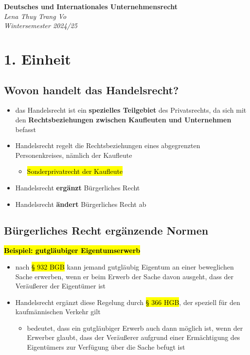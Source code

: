 \documentclass[a4paper, 10pt]{article}
\begin{document}
\begin{titlepage}
    \centering
    \vspace*{3cm}
    {\Huge \textbf{Deutsches und Internationales Unternehmensrecht}}\\[1.5cm]
    {\large \textit{Lena Thuy Trang Vo}}\\[0.5cm]
    {\large \textit{Wintersemester 2024/25}}\\[2cm]

    \vfill
\end{titlepage}

\tableofcontents
\newpage

\section{1. Einheit}
\subsection{Wovon handelt das Handelsrecht?}
\begin{itemize}
    \item das Handelsrecht ist ein \textbf{spezielles Teilgebiet} des Privatsrechts, da sich mit den \textbf{Rechtsbeziehungen zwischen Kaufleuten und Unternehmen} befasst
    \item  Handelsrecht regelt die Rechtsbeziehungen eines abgegrenzten Personenkreises, nämlich der Kaufleute
    \begin{itemize}
        \item \hl{Sonderprivatrecht der Kaufleute}
    \end{itemize}
    \item Handelsrecht \textbf{ergänzt} Bürgerliches Recht
    \item Handelsrecht \textbf{ändert} Bürgerliches Recht ab
\end{itemize}
\subsection{Bürgerliches Recht ergänzende Normen}
\textbf{\hl{Beispiel: gutgläubiger Eigentumserwerb}}
\begin{itemize}
    \item nach \hl{§ 932 BGB} kann jemand gutgläubig Eigentum an einer beweglichen Sache erwerben, wenn er beim Erwerb der Sache davon ausgeht, dass der Veräußerer der Eigentümer ist
    \item Handelsrecht ergänzt diese Regelung durch \hl{§ 366 HGB}, der speziell für den kaufmännischen Verkehr gilt
    \begin{itemize}
        \item bedeutet, dass ein gutgläubiger Erwerb auch dann möglich ist, wenn der Erwerber glaubt, dass der Veräußerer aufgrund einer Ermächtigung des Eigentümers zur Verfügung über die Sache befugt ist
    \end{itemize}
\end{itemize}
\end{document}
